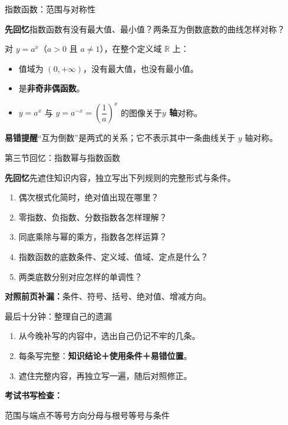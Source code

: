 \documentclass[UTF8,10pt,aspectratio=169]{ctexbeamer}
\newcommand{\Recall}[1]{\par\noindent\textcolor{KnowledgeBlue}{\textbf{先回忆}\quad #1}\par\vspace{0.3cm}}
\newcommand{\Pitfall}[1]{\par\vspace{0.22cm}\noindent\textbf{易错提醒}\quad #1\par}
\begin{document}
\begin{frame}[t]{指数函数：范围与对称性}
\Recall{指数函数有没有最大值、最小值？两条互为倒数底数的曲线怎样对称？}
\pause
对 $y=a^x$（$a>0$ 且 $a\ne1$），在整个定义域 $\mathbb R$ 上：
\begin{itemize}
\item 值域为 $(0,+\infty)$，没有最大值，也没有最小值。
\item 是\textbf{非奇非偶函数}。
\item $y=a^x$ 与 $y=a^{-x}=\left(\dfrac1a\right)^x$ 的图像关于\textbf{$y$ 轴}对称。
\end{itemize}
\Pitfall{“互为倒数”是两式的关系；它不表示其中一条曲线关于 $y$ 轴对称。}
\end{frame}

\begin{frame}[t]{第三节回忆：指数幂与指数函数}
\Recall{先遮住知识内容，独立写出下列规则的完整形式与条件。}
\begin{enumerate}
\item 偶次根式化简时，绝对值出现在哪里？
\item 零指数、负指数、分数指数各怎样理解？
\item 同底乘除与幂的乘方，指数各怎样运算？
\item 指数函数的底数条件、定义域、值域、定点是什么？
\item 两类底数分别对应怎样的单调性？
\end{enumerate}
\pause
\par\vspace{0.2cm}\textbf{对照前页补漏：}条件、符号、括号、绝对值、增减方向。
\end{frame}


\begin{frame}[t]{最后十分钟：整理自己的遗漏}
\begin{enumerate}
\item 从今晚补写的内容中，选出自己仍记不牢的几条。
\item 每条写完整：\textbf{知识结论＋使用条件＋易错位置}。
\item 遮住完整内容，再独立写一遍，随后对照修正。
\end{enumerate}
\par\vspace{0.55cm}
\textbf{考试书写检查：}\par\vspace{0.25cm}
范围与端点\quad 不等号方向\quad 分母与根号\quad 等号与条件
\end{frame}
\end{document}
